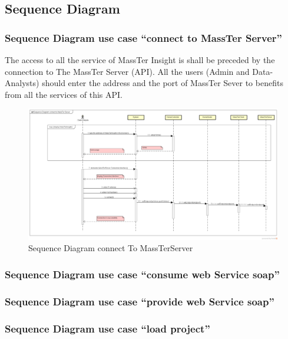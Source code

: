 \documentclass[12pt]{article}
\begin{document}
	\subsection{Sequence Diagram}
	\subsubsection{Sequence Diagram use case ``connect to MassTer Server''}
	The access to all the service of MassTer Insight is shall be preceded by the connection to The MassTer Server (API). All the users (Admin and Data-Analysts) should enter the address and the port of MassTer Sever to benefits from all the services of this API.
	
	\begin{figure}[h]
		\centering
		\includegraphics[width=1\textwidth]{SequenceDiagramconnectToMassTerServer.png}
		\caption{Sequence Diagram connect To MassTerServer}
	\end{figure}   
	
	\clearpage
	\newpage
	\subsubsection{Sequence Diagram use case ``consume web Service soap''}
	\clearpage
	\newpage
	\subsubsection{Sequence Diagram use case ``provide web Service soap''}
	\clearpage
	\newpage
	\subsubsection{Sequence Diagram use case ``load project''}
\end{document}
